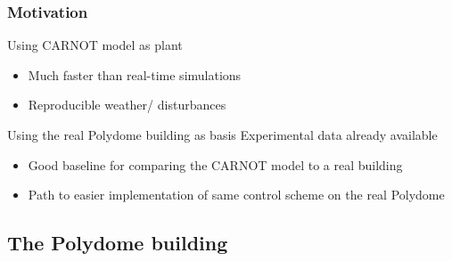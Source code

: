 \begin{frame}
    \frametitle{Motivation}
    \begin{block}{Using CARNOT model as plant}
        \vspace{10pt}
        \begin{itemize}
            \item Much faster than real-time simulations \vspace{10pt}
            \item Reproducible weather/ disturbances \vspace{10pt}
        \end{itemize}
    \end{block}

    \begin{block}{Using the real Polydome building as basis}
        Experimental data already available
        \vspace{10pt}
        \begin{itemize}
            \item  Good baseline for comparing the CARNOT model to a real
                building \vspace{10pt}
            \item  Path to easier implementation of same control scheme on the
                real Polydome \vspace{10pt}
        \end{itemize}
    \end{block}
\end{frame}

\subsection{The Polydome building}

